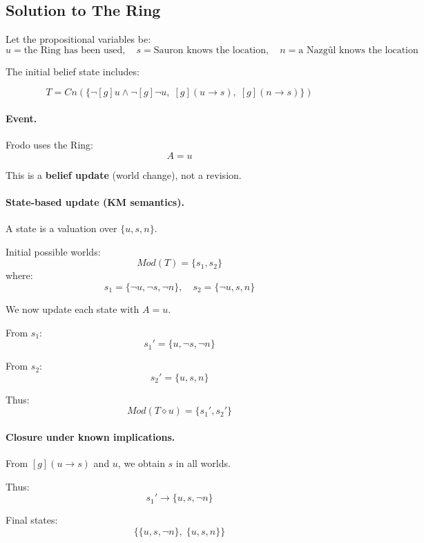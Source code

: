 \documentclass[11pt]{article}
\begin{document}
    \subsection{Solution to The Ring}

    Let the propositional variables be:
    \[
    u = \text{the Ring has been used}, \quad
    s = \text{Sauron knows the location}, \quad
    n = \text{a Nazg\^ul knows the location}
    \]

    The initial belief state includes:

    \[
    T = Cn(\{
    \neg [g]u \wedge \neg [g]\neg u,\;
    [g](u \rightarrow s),\;
    [g](n \rightarrow s)
    \})
    \]

    \paragraph{Event.}
    Frodo uses the Ring:
    \[
    A = u
    \]

    This is a \textbf{belief update} (world change), not a revision.

    \paragraph{State-based update (KM semantics).}

    A state is a valuation over $\{u, s, n\}$.

    Initial possible worlds:
    \[
    Mod(T) = \{ s_1, s_2 \}
    \]
    where:
    \[
    s_1 = \{\neg u, \neg s, \neg n\}, \quad
    s_2 = \{\neg u, s, n\}
    \]

    We now update each state with $A = u$.

    From $s_1$:
    \[
    s_1' = \{u, \neg s, \neg n\}
    \]

    From $s_2$:
    \[
    s_2' = \{u, s, n\}
    \]

    Thus:
    \[
    Mod(T \diamond u) = \{ s_1', s_2' \}
    \]

    \paragraph{Closure under known implications.}

    From $[g](u \rightarrow s)$ and $u$, we obtain $s$ in all worlds.

    Thus:
    \[
    s_1' \rightarrow \{u, s, \neg n\}
    \]

    Final states:
    \[
    \{ \{u, s, \neg n\},\; \{u, s, n\} \}
    \]
\end{document}
